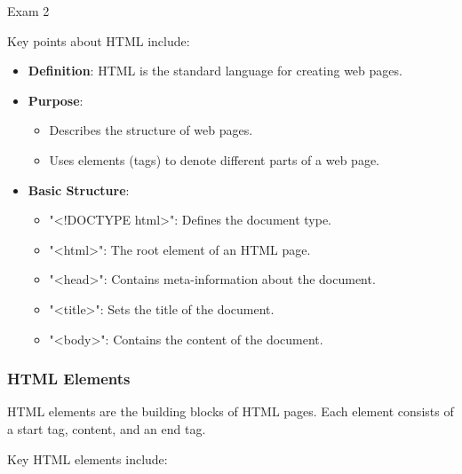 \begin{examnotes}{Exam 2}
    \begin{highlight}
        Key points about HTML include:
        
        \begin{itemize}
            \item \textbf{Definition}: HTML is the standard language for creating web pages.
            \item \textbf{Purpose}:
                \begin{itemize}
                    \item Describes the structure of web pages.
                    \item Uses elements (tags) to denote different parts of a web page.
                \end{itemize}
            \item \textbf{Basic Structure}:
                \begin{itemize}
                    \item "<!DOCTYPE html>": Defines the document type.
                    \item "<html>": The root element of an HTML page.
                    \item "<head>": Contains meta-information about the document.
                    \item "<title>": Sets the title of the document.
                    \item "<body>": Contains the content of the document.
                \end{itemize}
        \end{itemize}
    \end{highlight}
    
    \subsubsection*{HTML Elements}
    
    HTML elements are the building blocks of HTML pages. Each element consists of a start tag, content, and an end tag.
    
    \begin{highlight}
        Key HTML elements include:
        

\end{highlight}
\end{examnotes}
